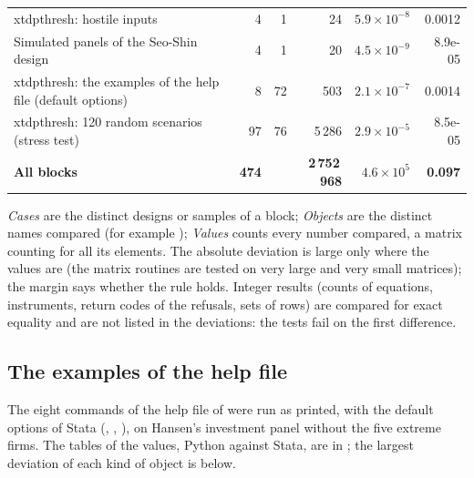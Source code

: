 \begin{longtable}{@{}p{7.4cm}rrrrr@{}}
xtdpthresh: hostile inputs & 4 & 1 & 24 & $5.9\times10^{-8}$ & 0.0012 \\
Simulated panels of the Seo-Shin design & 4 & 1 & 20 & $4.5\times10^{-9}$ & 8.9e-05 \\
xtdpthresh: the examples of the help file (default options) & 8 & 72 & 503 & $2.1\times10^{-7}$ & 0.0014 \\
xtdpthresh: 120 random scenarios (stress test) & 97 & 76 & 5\,286 & $2.9\times10^{-5}$ & 8.5e-05 \\
\midrule
\textbf{All blocks} & \textbf{474} & & \textbf{2\,752\,968} & \textbf{$4.6\times10^{5}$} & \textbf{0.097} \\
\bottomrule
\end{longtable}

\noindent \emph{Cases} are the distinct designs or samples of a block; \emph{Objects} are the
distinct names compared (for example ); \emph{Values} counts every number compared, a
matrix counting for all its elements. The absolute deviation is large only where the values
are (the matrix routines are tested on very large and very small matrices); the margin says
whether the rule holds. Integer results (counts of equations, instruments, return
codes of the refusals, sets of rows) are compared for exact equality and are not listed in the
deviations: the tests fail on the first difference.

\subsection{The examples of the help file}

The eight commands of the help file of  were run as printed, with the default options of Stata
(, , ), on Hansen's investment panel without the five extreme firms.
The tables of the values, Python against Stata, are in ; the largest deviation of each
kind of object is below.


